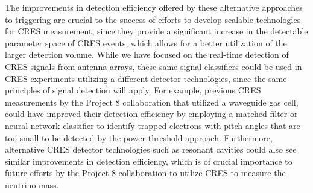 The improvements in detection efficiency offered by these alternative approaches to triggering are crucial to the success of efforts to develop scalable technologies for CRES measurement, since they provide a significant increase in the detectable parameter space of CRES events, which allows for a better utilization of the larger detection volume. While we have focused on the real-time detection of CRES signals from antenna arrays, these same signal classifiers could be used in CRES experiments utilizing a different detector technologies, since the same principles of signal detection will apply. For example, previous CRES measurements by the Project 8 collaboration that utilized a waveguide gas cell, could have improved their detection efficiency by employing a matched filter or neural network classifier to identify trapped electrons with pitch angles that are too small to be detected by the power threshold approach. Furthermore, alternative CRES detector technologies such as resonant cavities \cite{p8snowmass2022} could also see similar improvements in detection efficiency, which is of crucial importance to future efforts by the Project 8 collaboration to utilize CRES to measure the neutrino mass.


